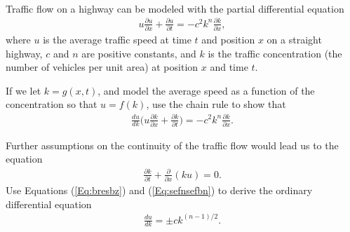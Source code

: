 \item  {}\\ 
Traffic flow on a highway can be modeled with the partial differential equation
\begin{align}\label{Eq:bresbz}
  u\frac{\partial u}{\partial x}+\frac{\partial u}{\partial t}=-c^2k^n\frac{\partial k}{\partial x},
\end{align}
where $u$ is the average traffic speed at time $t$ and position $x$ on a straight highway,  $c$ and $n$ are positive constants, and $k$ is the traffic concentration (the number of vehicles per unit area) at position $x$ and time $t$. 
\BEN
\item If we  let $k=g(x,t)$, and model the average speed as a function of the concentration so that $u=f(k)$, use the chain rule to show that
\begin{align}\label{xcvbxcvbxcvb}
  \frac{du}{dk} \Bigg(u\frac{\partial k}{\partial x}+\frac{\partial k}{\partial t}\Bigg)=-c^2k^n\frac{\partial k}{\partial x}.
\end{align}
\item Further assumptions on the continuity of the traffic flow would lead us to the equation
\begin{align}\label{Eq:sefnsefbn}
  \frac{\partial k}{\partial t}+\frac{\partial}{\partial x}(ku)=0.
\end{align}
Use Equations (\ref{Eq:bresbz}) and (\ref{Eq:sefnsefbn}) to derive the ordinary differential equation
\begin{align}\label{myrtntebrebrebrez}
  \frac{du}{dk}= \pm ck^{(n-1)/2}.
\end{align}
\EEN
\EEN
